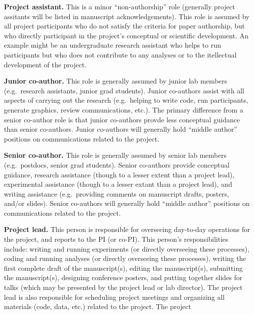 \documentclass{tufte-book} %
\begin{document}
\begin{list}{P:~}{}
\item \textbf{Project assistant.}  This is a minor ``non-authorship''
  role (generally project assitants will be listed in manuscript
  acknowledgements).  This role is assumed by all project participants
  who do not satisfy the criteria for paper
  authorship, but who directly
  participant in the project's conceptual or scientific development.
  An example might be an undergraduate research assistant who helps to
  run participants but who does not contribute to any analyses or to
  the itellectual development of the project.
\item \textbf{Junior co-author.}  This role is generally assumed by
  junior lab members (e.g.\ research assistants, junior grad
  students).  Junior co-authors assist with all aspects of carrying
  out the research (e.g.\ helping to write code, run participants,
  generate graphics, review communications, etc.).  The primary
  difference from a senior co-author role is that junior co-authors
  provde less conceptual guidance than senior co-authors.  Junior
  co-authors will generally hold ``middle author'' positions on
  communications related to the project.
\item \textbf{Senior co-author.}  This role is generally assumed by
  senior lab members (e.g.\ postdocs, senior grad students).  Senior
  co-authors provide conceptual guidance, research assistance (though
  to a lesser extent than a project lead), experimental assistance
  (though to a lesser extant than a project lead), and writing
  assistance (e.g.\ providing comments on manuscript drafts, posters,
  and/or slides).  Senior co-authors will generally hold ``middle
  author'' positions on communications related to the project.
\item \textbf{Project lead.}  This person is responsible for
  overseeing day-to-day operations for the project, and reports to the
  PI (or co-PI).  This person's responsibilities include: writing and
  running experiments (or directly overseeing these processes), coding
  and running analyses (or directly overseeing these processes),
  writing the first complete draft of the manuscript(s), editing the
  manuscript(s), submitting the manuscript(s), designing conference
  posters, and putting together slides for talks (which may be
  presented by the project lead or lab director).  The project lead is
  also responsible for scheduling project meetings and organizing all
  materials (code, data, etc.) related to the project.  The project

\end{list}
\end{document}
